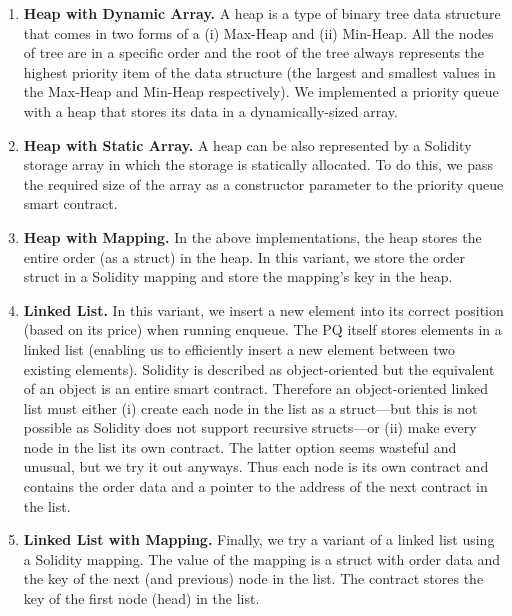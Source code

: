 \begin{enumerate}


\item\textbf{{Heap with Dynamic Array.}} A heap is a type of binary tree data structure that comes in two forms of a (i) Max-Heap and (ii) Min-Heap. All the nodes of tree are in a specific order and the root of the tree always represents the highest priority item of the data structure (the largest and smallest values in the Max-Heap and Min-Heap respectively). We implemented a priority queue with a heap that stores its data in a dynamically-sized array. 


\item\textbf{{Heap with Static Array.}} A heap can be also represented by a Solidity storage array in which the storage is statically allocated. To do this, we pass the required size of the array as a constructor parameter to the priority queue smart contract. 


\item\textbf{{Heap with Mapping.}} In the above implementations, the heap stores the entire order (as a struct) in the heap. In this variant, we store the order struct in a Solidity mapping and store the mapping's key in the heap.  


\item\textbf{{Linked List.}} In this variant, we insert a new element into its correct position (based on its price) when running enqueue. The PQ itself stores elements in a linked list (enabling us to efficiently insert a new element between two existing elements). Solidity is described as object-oriented but the equivalent of an object is an entire smart contract. Therefore an object-oriented linked list must either (i) create each node in the list as a struct---but this is not possible as Solidity does not support recursive structs---or (ii) make every node in the list its own contract. The latter option seems wasteful and unusual, but we try it out anyways. Thus each node is its own contract and contains the order data and a pointer to the address of the next contract in the list.


\item\textbf{{Linked List with Mapping.}} Finally, we try a variant of a linked list using a Solidity mapping. The value of the mapping is a struct with order data and the key of the next (and previous) node in the list. The contract stores the key of the first node (head) in the list. 


\end{enumerate}

